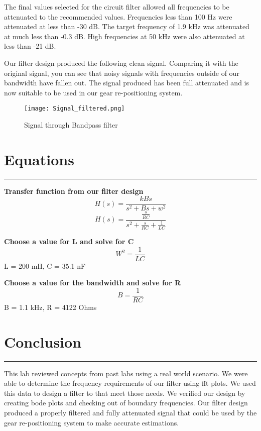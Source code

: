 \documentclass[12pt]{report}
\begin{document}
The final values selected for the circuit filter allowed all frequencies to be attenuated to the recommended values. Frequencies less than 100 Hz were attenuated at less than -30 dB. The target frequency of 1.9 kHz was attenuated at much less than -0.3 dB. High frequencies at 50 kHz were also attenuated at less than -21 dB.\par

Our filter design produced the following clean signal. Comparing it with the original signal, you can see that noisy signals with frequencies outside of our bandwidth have fallen out. The signal produced has been full attenuated and is now suitable to be used in our gear re-positioning system. 

\begin{figure}[ht!]
    \centering
    \texttt{[image: Signal\_filtered.png]}
    \caption{Signal through Bandpass filter}
    \label{fig:my_label}
\end{figure}

\clearpage
\section*{Equations}
\hrule
\vspace{1cm}
\setlength{\parindent}{5ex}

\begin{center}
    \textbf{Transfer function from our filter design}
    $$H(s) = \frac{kBs}{s^{2} + Bs + w^{2}}$$
    $$H(s) = \frac {\frac{s}{RC}} {s^{2} + \frac {s}{RC} + \frac{1}{LC}} $$
\end{center} 

\begin{center}
    \textbf{Choose a value for L and solve for C}
    $$W^{2} = \frac{1}{LC}$$
    L = 200 mH, C = 35.1 nF
\end{center} 

\begin{center}
    \textbf{Choose a value for the bandwidth and solve for R}
    $$B = \frac{1}{RC}$$
    B = 1.1 kHz, R = 4122 Ohms
\end{center} 

\section*{Conclusion}
\hrule
\vspace{1cm}
\setlength{\parindent}{5ex}
This lab reviewed concepts from past labs using a real world scenario. We were able to determine the frequency requirements of our filter using fft plots. We used this data to design a filter to that meet those needs. We verified our design by creating bode plots and checking out of boundary frequencies. Our filter design produced a properly filtered and fully attenuated signal that could be used by the gear re-positioning system to make accurate estimations. 
\end{document}
